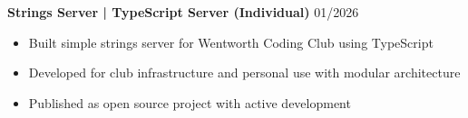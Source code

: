 \noindent
\textbf{Strings Server | TypeScript Server (Individual)} \hfill 01/2026
\begin{itemize}
    \item Built simple strings server for Wentworth Coding Club using TypeScript
    \item Developed for club infrastructure and personal use with modular architecture
    \item Published as open source project with active development
\end{itemize}
